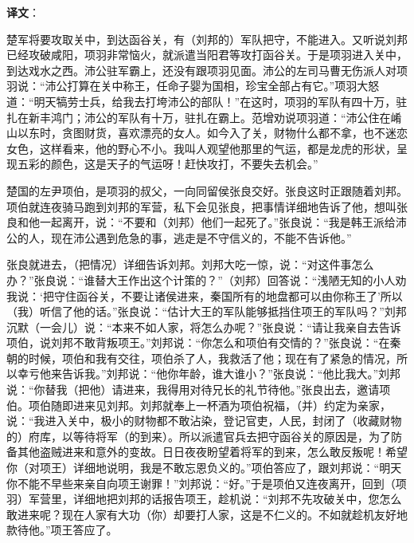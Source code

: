 \documentclass[12pt,UTF-8,openany,a4]{ctexbook}
\begin{document}
\newpage

\begin{Large}
   \noindent \textbf{译文}：
\end{Large}

\vspace{1em}

\begin{large}\yiwen
    
    楚军将要攻取关中，到达函谷关，有（刘邦的）军队把守，不能进入。又听说刘邦已经攻破咸阳，项羽非常恼火，就派遣当阳君等攻打函谷关。于是项羽进入关中，到达戏水之西。沛公驻军霸上，还没有跟项羽见面。沛公的左司马曹无伤派人对项羽说：“沛公打算在关中称王，任命子婴为国相，珍宝全部占有它。”项羽大怒道：“明天犒劳士兵，给我去打垮沛公的部队！”在这时，项羽的军队有四十万，驻扎在新丰鸿门；沛公的军队有十万，驻扎在霸上。范增劝说项羽道：“沛公住在崤山以东时，贪图财货，喜欢漂亮的女人。如今入了关，财物什么都不拿，也不迷恋女色，这样看来，他的野心不小。我叫人观望他那里的气运，都是龙虎的形状，呈现五彩的颜色，这是天子的气运呀！赶快攻打，不要失去机会。”
    
    楚国的左尹项伯，是项羽的叔父，一向同留侯张良交好。张良这时正跟随着刘邦。项伯就连夜骑马跑到刘邦的军营，私下会见张良，把事情详细地告诉了他，想叫张良和他一起离开，说：“不要和（刘邦）他们一起死了。”张良说：“我是韩王派给沛公的人，现在沛公遇到危急的事，逃走是不守信义的，不能不告诉他。”
    
    张良就进去，（把情况）详细告诉刘邦。刘邦大吃一惊，说：“对这件事怎么办？”张良说：“谁替大王作出这个计策的？”（刘邦）回答说：“浅陋无知的小人劝我说：‘把守住函谷关，不要让诸侯进来，秦国所有的地盘都可以由你称王了’所以（我）听信了他的话。”张良说：“估计大王的军队能够抵挡住项王的军队吗？”刘邦沉默（一会儿）说：“本来不如人家，将怎么办呢？”张良说：“请让我亲自去告诉项伯，说刘邦不敢背叛项王。”刘邦说：“你怎么和项伯有交情的？”张良说：“在秦朝的时候，项伯和我有交往，项伯杀了人，我救活了他；现在有了紧急的情况，所以幸亏他来告诉我。”刘邦说：“他你年龄，谁大谁小？”张良说：“他比我大。”刘邦说：“你替我（把他）请进来，我得用对待兄长的礼节待他。”张良出去，邀请项伯。项伯随即进来见刘邦。刘邦就奉上一杯酒为项伯祝福，（并）约定为亲家，说：“我进入关中，极小的财物都不敢沾染，登记官吏，人民，封闭了（收藏财物的）府库，以等待将军（的到来）。所以派遣官兵去把守函谷关的原因是，为了防备其他盗贼进来和意外的变故。日日夜夜盼望着将军的到来，怎么敢反叛呢！希望你（对项王）详细地说明，我是不敢忘恩负义的。”项伯答应了，跟刘邦说：“明天你不能不早些来亲自向项王谢罪！”刘邦说：“好。”于是项伯又连夜离开，回到（项羽）军营里，详细地把刘邦的话报告项王，趁机说：“刘邦不先攻破关中，您怎么敢进来呢？现在人家有大功（你）却要打人家，这是不仁义的。不如就趁机友好地款待他。”项王答应了。
    

\end{large}
\end{document}
